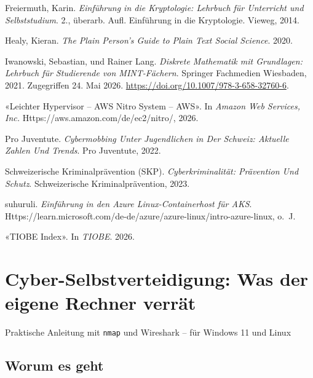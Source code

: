 \documentclass[
  nswissgerman,
  a4paper,
  DIV=11,
  numbers=noendperiod,
  ngerman]{scrreprt}
\newlength{\cslhangindent}
\newenvironment{CSLReferences}[2] %
 {\begin{list}{}{%
  \setlength{\itemindent}{0pt}
  \setlength{\leftmargin}{0pt}
  \setlength{\parsep}{0pt}
  \ifodd #1
   \setlength{\leftmargin}{\cslhangindent}
   \setlength{\itemindent}{-1\cslhangindent}
  \fi
  \setlength{\itemsep}{#2\baselineskip}}}
 {\end{list}}
\begin{document}
\begin{CSLReferences}{1}{1}
Freiermuth, Karin. \emph{{Einführung in die Kryptologie: Lehrbuch für
Unterricht und Selbststudium}}. 2., überarb. Aufl. {Einführung in die
Kryptologie}. Vieweg, 2014.

Healy, Kieran. \emph{The {Plain Person}'s {Guide} to {Plain Text Social
Science}}. 2020.

Iwanowski, Sebastian, und Rainer Lang. \emph{{Diskrete Mathematik mit
Grundlagen: Lehrbuch für Studierende von MINT-Fächern}}. Springer
Fachmedien Wiesbaden, 2021. Zugegriffen 24. Mai 2026.
\url{https://doi.org/10.1007/978-3-658-32760-6}.

{«{Leichter Hypervisor -- AWS Nitro System -- AWS}»}. In \emph{Amazon
Web Services, Inc.} Https://aws.amazon.com/de/ec2/nitro/, 2026.

Pro Juventute. \emph{Cybermobbing Unter Jugendlichen in Der Schweiz:
{Aktuelle} Zahlen Und Trends}. Pro Juventute, 2022.

Schweizerische Kriminalprävention (SKP). \emph{Cyberkriminalität:
{Prävention} Und Schutz}. Schweizerische Kriminalprävention, 2023.

{suhuruli}. \emph{{Einführung in den Azure Linux-Containerhost für
AKS}}.
Https://learn.microsoft.com/de-de/azure/azure-linux/intro-azure-linux,
o.~J.

{«{TIOBE Index}»}. In \emph{TIOBE}. 2026.

\end{CSLReferences}

\chapter{Cyber-Selbstverteidigung: Was der eigene Rechner
verrät}\label{cyber-selbstverteidigung-was-der-eigene-rechner-verruxe4t}

Praktische Anleitung mit \texttt{nmap} und Wireshark -- für Windows 11
und Linux

\hfill\break

\section{Worum es geht}\label{worum-es-geht}
\end{document}
